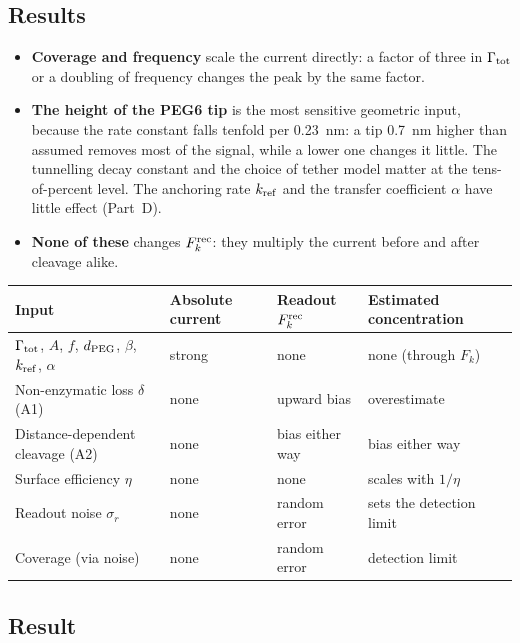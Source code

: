 \documentclass[10pt,a4paper]{article}
\numberwithin{equation}{section}
\newcommand{\Fk}{F_k}
\newcommand{\Fkrec}{F_k^{\rm rec}}
\newcommand{\Grtot}{\Gamma_{\rm tot}}
\newcommand{\kref}{k_{\rm ref}}
\begin{document}
\subsection{Results}

\begin{itemize}[leftmargin=*]
\item \textbf{Coverage and frequency} scale the current directly: a factor of three in $\Grtot$ or a doubling of
  frequency changes the peak by the same factor.
\item \textbf{The height of the PEG6 tip} is the most sensitive geometric input, because the rate constant falls tenfold per
  0.23~nm: a tip 0.7~nm higher than assumed removes most of the signal, while a lower one changes it little. The
  tunnelling decay constant and the choice of tether model matter at the tens-of-percent level. The
  anchoring rate $\kref$ and the transfer coefficient $\alpha$ have little effect (Part~D).
\item \textbf{None of these} changes $\Fkrec$: they multiply the current before and after cleavage alike.
\end{itemize}

\begin{center}
\small\renewcommand{\arraystretch}{1.2}
\begin{tabular}{@{}p{4.3cm}p{2.7cm}p{2.7cm}p{3.6cm}@{}}
\toprule
Input & Absolute current & Readout $\Fkrec$ & Estimated concentration \\
\midrule
$\Grtot$, $A$, $f$, $d_{\rm PEG}$, $\beta$, $\kref$, $\alpha$ & strong & none & none (through $\Fk$) \\
Non-enzymatic loss $\delta$ (A1) & none & upward bias & overestimate \\
Distance-dependent cleavage (A2) & none & bias either way & bias either way \\
Surface efficiency $\eta$ & none & none & scales with $1/\eta$ \\
Readout noise $\sigma_r$ & none & random error & sets the detection limit \\
Coverage (via noise) & none & random error & detection limit \\
\bottomrule
\end{tabular}
\end{center}

\subsection{Result}
\end{document}
